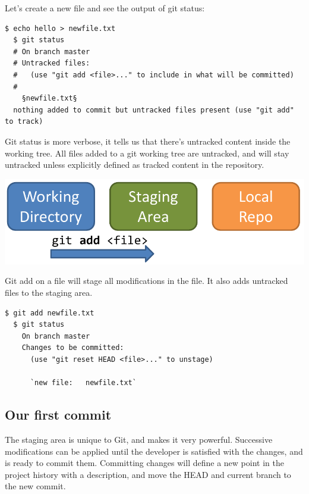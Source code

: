 \documentclass{tufte-handout}
\begin{document}
Let's create a new file and see the output of git status:

\begin{lstlisting}[style=BashInputStyle]
  $ echo hello > newfile.txt
  $ git status
  # On branch master
  # Untracked files:
  #   (use "git add <file>..." to include in what will be committed)
  #
    §newfile.txt§
  nothing added to commit but untracked files present (use "git add" to track)
\end{lstlisting}

Git status is more verbose, it tells us that there's untracked content inside the working tree.
All files added to a git working tree are untracked, and will stay untracked unless explicitly defined as tracked content in the repository.

\begin{marginfigure}%
  \centering
  \includegraphics[width=\linewidth]{gitadd-schema.pdf}
  \label{fig:gitadd}
  \caption{Git add on a file will stage all modifications in the file. It also adds untracked files to the staging area.}
\end{marginfigure}

\begin{lstlisting}[style=BashInputStyle]
  $ git add newfile.txt
  $ git status
    On branch master
    Changes to be committed:
      (use "git reset HEAD <file>..." to unstage)
  
	  `new file:   newfile.txt`
\end{lstlisting}

\subsection{Our first commit}

The staging area is unique to Git, and makes it very powerful.
Successive modifications can be applied until the developer is satisfied with the changes, and is ready to commit them.
Committing changes will define a new point in the project history with a description, and move the HEAD and current branch to the new commit.
\end{document}
